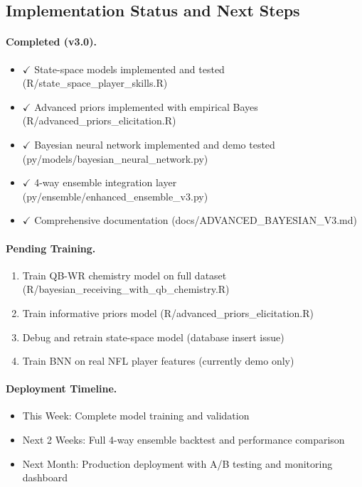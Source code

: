 \subsection{Implementation Status and Next Steps}

\paragraph{Completed (v3.0).}
\begin{itemize}
  \item $\checkmark$ State-space models implemented and tested (R/state\_space\_player\_skills.R)
  \item $\checkmark$ Advanced priors implemented with empirical Bayes (R/advanced\_priors\_elicitation.R)
  \item $\checkmark$ Bayesian neural network implemented and demo tested (py/models/bayesian\_neural\_network.py)
  \item $\checkmark$ 4-way ensemble integration layer (py/ensemble/enhanced\_ensemble\_v3.py)
  \item $\checkmark$ Comprehensive documentation (docs/ADVANCED\_BAYESIAN\_V3.md)
\end{itemize}

\paragraph{Pending Training.}
\begin{enumerate}
  \item Train QB-WR chemistry model on full dataset (R/bayesian\_receiving\_with\_qb\_chemistry.R)
  \item Train informative priors model (R/advanced\_priors\_elicitation.R)
  \item Debug and retrain state-space model (database insert issue)
  \item Train BNN on real NFL player features (currently demo only)
\end{enumerate}

\paragraph{Deployment Timeline.}
\begin{itemize}
  \item This Week: Complete model training and validation
  \item Next 2 Weeks: Full 4-way ensemble backtest and performance comparison
  \item Next Month: Production deployment with A/B testing and monitoring dashboard
\end{itemize}

